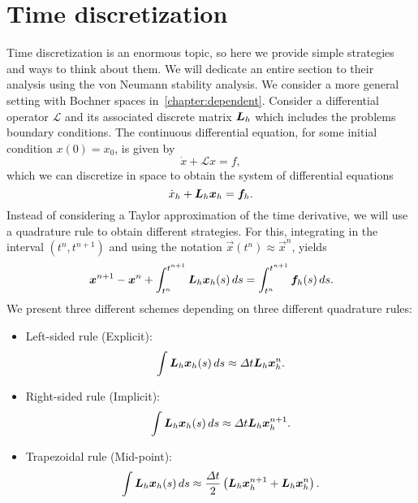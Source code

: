 \section{Time discretization}\label{sec:fd-time-discretization}
Time discretization is an enormous topic, so here we provide simple strategies and ways to think about them. We will dedicate an entire section to their analysis using the von Neumann stability analysis. We consider a more general setting with Bochner spaces in~\ref{chapter:dependent}. Consider a differential operator $\mathcal L$ and its associated discrete matrix $\mat L_h$ which includes the problems boundary conditions. The continuous differential equation, for some initial condition $x(0) = x_0$, is given by 
\begin{equation}
    \dot x + \mathcal L x = f,
\end{equation}
which we can discretize in space to obtain the system of differential equations
\begin{equation}
    \dot x_h + \mat L_h \vec x_h = \vec f_h.
\end{equation}
Instead of considering a Taylor approximation of the time derivative, we will use a quadrature rule to obtain different strategies. For this, integrating in the interval $(t^n, t^{n+1})$ and using the notation $\vec x(t^n) \approx \vec x^{n}$, yields
\begin{equation}
    \vec x^{n+1} - \vec x^n + \int_{t^n}^{t^{n+1}} \mat L_h \vec x_h(s) \,ds = \int_{t^n}^{t^{n+1}} \vec f_h(s)\,ds.
\end{equation}
We present three different schemes depending on three different quadrature rules: 
\begin{itemize}
    \item Left-sided rule (Explicit):
        \begin{equation}
            \int \mat L_h \vec x_h(s)\,ds \approx \Delta t \mat L_h\vec x_h^n.
        \end{equation}
    \item Right-sided rule (Implicit): 
        \begin{equation}
            \int \mat L_h \vec x_h(s)\,ds \approx \Delta t\mat L_h\vec x_h^{n+1}.
        \end{equation}
    \item Trapezoidal rule (Mid-point): 
        \begin{equation}
            \int \mat L_h \vec x_h(s)\,ds \approx \frac{\Delta t}{2}\left(\mat L_h\vec x_h^{n+1}+ \mat L_h \vec x_h^n\right).
        \end{equation}
    \end{itemize}
